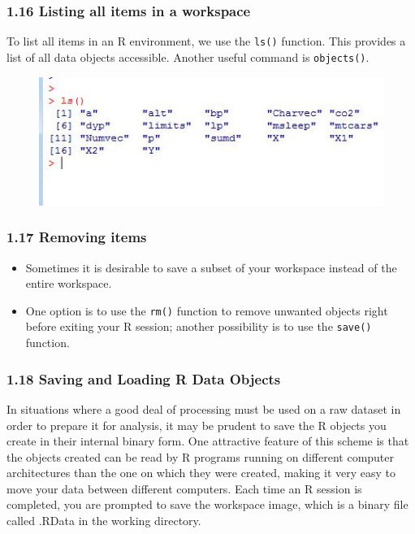 \documentclass{beamer}
\begin{document}
 \begin{frame}
 	\frametitle{1.16 Listing all items in a workspace}
 	To list all items in an R environment, we use the \texttt{ls()} function. This provides a list of all data
 	objects accessible. Another useful command is \texttt{objects()}.
 	\begin{figure}
 		\centering
 		\includegraphics[width=0.7\linewidth]{images/ObjectsList}
 		\caption{}
 		\label{fig:ObjectsList}
 	\end{figure}
 	
 \end{frame}
 \begin{frame}
 	\frametitle{1.17 Removing items}
 	\begin{itemize}
 		\item Sometimes it is desirable to save a subset of your workspace instead of the entire workspace.
 		\item One option is to use the \texttt{rm()} function to remove unwanted objects right before exiting your R
 		session; another possibility is to use the \texttt{save()} function.
 	\end{itemize}
 \end{frame}
 \begin{frame}
 	\frametitle{1.18 Saving and Loading R Data Objects}
 	In situations where a good deal of processing must be used on a raw dataset in order to prepare
 	it for analysis, it may be prudent to save the R objects you create in their internal binary form.
 	One attractive feature of this scheme is that the objects created can be read by R programs
 	running on different computer architectures than the one on which they were created, making it
 	very easy to move your data between different computers. Each time an R session is completed,
 	you are prompted to save the workspace image, which is a binary file called .RData in the
 	working directory.
 \end{frame}
\end{document}
